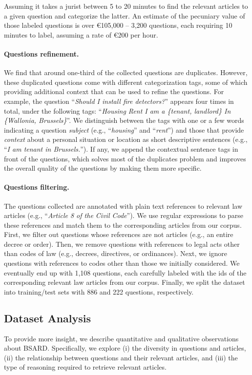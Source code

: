 \documentclass[11pt]{article}
\begin{document}
Assuming it takes a jurist between 5 to 20 minutes to find the relevant articles to a given question and categorize the latter. An estimate of the pecuniary value of those labeled questions is over €105,000 -- 3,200 questions, each requiring 10 minutes to label, assuming a rate of €200 per hour.

\paragraph{Questions refinement.}
We find that around one-third of the collected questions are duplicates. However, these duplicated questions come with different categorization tags, some of which providing additional context that can be used to refine the questions. For example, the question ``\textsl{Should I install fire detectors?}'' appears four times in total, under the following tags: ``\textsl{Housing  Rent  I am a \{\textit{tenant}, \textit{landlord}\}  In \{\textit{Wallonia}, \textit{Brussels}\}}''. We distinguish between the tags with one or a few words indicating a question \textit{subject} (e.g., ``\textsl{housing}'' and ``\textsl{rent}'') and those that provide \textit{context} about a personal situation or location as short descriptive sentences (e.g., ``\textsl{I am tenant in Brussels.}''). If any, we append the contextual sentence tags in front of the questions, which solves most of the duplicates problem and improves the overall quality of the questions by making them more specific.

\paragraph{Questions filtering.}
The questions collected are annotated with plain text references to relevant law articles (e.g., “\textsl{Article 8 of the Civil Code}”). We use regular expressions to parse these references and match them to the corresponding articles from our corpus. First, we filter out questions whose references are not articles (e.g., an entire decree or order). Then, we remove questions with references to legal acts other than codes of law (e.g., decrees, directives, or ordinances). Next, we ignore questions with references to codes other than those we initially considered. We eventually end up with 1,108 questions, each carefully labeled with the ids of the corresponding relevant law articles from our corpus. Finally, we split the dataset into training/test sets with 886 and 222 questions, respectively.


\subsection{Dataset Analysis \label{subsec:dataset-analysis}}
To provide more insight, we describe quantitative and qualitative observations about BSARD. Specifically, we explore (i) the diversity in questions and articles, (ii) the relationship between questions and their relevant articles, and (iii) the type of reasoning required to retrieve relevant articles.
\end{document}
